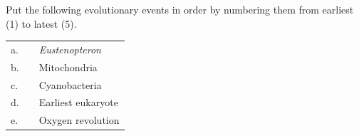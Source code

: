 \question[5]
Put the following evolutionary events in order by numbering them from earliest (1) to latest (5).
\vspace*{\baselineskip}


\begin{tabular}{@{}L{0.35cm}R{1.1cm}l@{}}
a.  &     &   \textit{Eustenopteron} \\[1em]

b.  &     &   Mitochondria \\[1em]

c.  &     &   Cyanobacteria \\[1em]

d.  &     &   Earliest eukaryote \\[1em]

e.  &     &   Oxygen revolution \\

\end{tabular}


